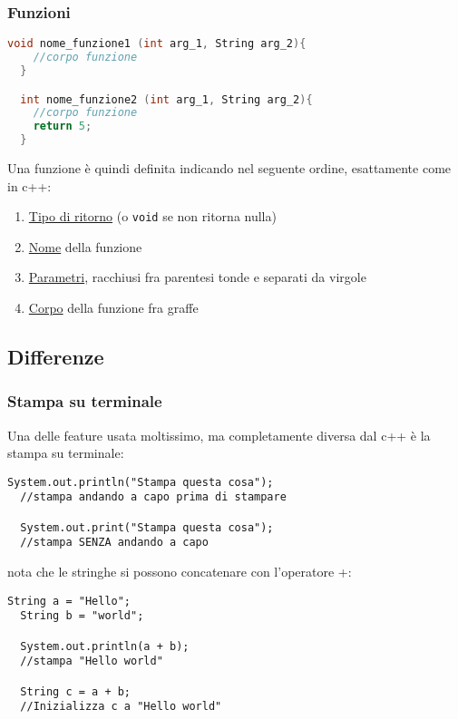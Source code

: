 \subsubsection{Funzioni}
\begin{lstlisting}[language = c, frame = none]
  void nome_funzione1 (int arg_1, String arg_2){
    //corpo funzione
  }

  int nome_funzione2 (int arg_1, String arg_2){
    //corpo funzione
    return 5;
  }
        \end{lstlisting}

Una funzione è quindi definita indicando nel seguente ordine, esattamente come in c++:
\begin{enumerate}
	\item \underline{Tipo di ritorno} (o \verb|void| se non ritorna nulla)
	\item \underline{Nome} della funzione
	\item \underline{Parametri}, racchiusi fra parentesi tonde e separati da virgole
	\item \underline{Corpo} della funzione fra graffe
\end{enumerate}
\subsection{Differenze}
\subsubsection{Stampa su terminale}
Una delle feature usata moltissimo, ma completamente diversa dal c++ è la stampa su terminale:
\begin{lstlisting}[frame = none]
  System.out.println("Stampa questa cosa");
  //stampa andando a capo prima di stampare

  System.out.print("Stampa questa cosa");
  //stampa SENZA andando a capo
\end{lstlisting}

\vskip3mm
nota che le stringhe si possono concatenare con l'operatore +:

\vskip3mm
\begin{lstlisting}[frame = none]
  String a = "Hello";
  String b = "world";

  System.out.println(a + b);
  //stampa "Hello world"

  String c = a + b;
  //Inizializza c a "Hello world"
  
\end{lstlisting}
